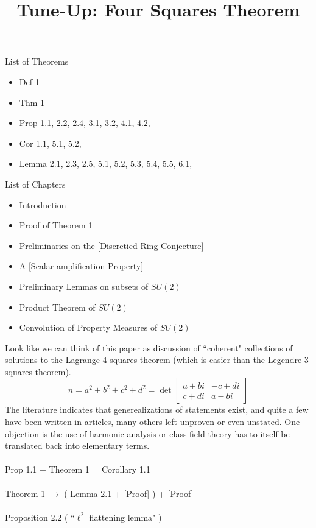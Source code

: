 \documentclass[12pt]{article}
\title{Tune-Up: Four Squares Theorem}
\date{}
\begin{document}
\sffamily

\maketitle

\noindent List of Theorems  

\begin{itemize}
\item Def 1
\item Thm 1
\item Prop 1.1, 2.2, 2.4, 3.1, 3.2, 4.1, 4.2, 
\item Cor 1.1, 5.1, 5.2, 
\item Lemma 2.1, 2.3, 2.5, 5.1, 5.2, 5.3, 5.4, 5.5, 6.1, 
\end{itemize}
List of Chapters 
\begin{itemize}
\item Introduction
\item Proof of Theorem 1
\item Preliminaries on the [Discretied Ring Conjecture]
\item A [Scalar amplification Property]
\item Preliminary Lemmas on subsets of $SU(2)$
\item Product Theorem of $SU(2)$
\item Convolution of Property Measures of $SU(2)$
\end{itemize}
Look like we can think of this paper as discussion of ``coherent" collections of solutions to the Lagrange 4-squares theorem (which is easier than the Legendre 3-squares theorem). 
$$ n = a^2 + b^2 + c^2 + d^2 = \det \left[\begin{array}{cr} a + bi & -c + di \\ c + di & a - bi\end{array} \right] $$
The literature indicates that generealizations of statements exist, and quite a few have been written in articles, many others left unproven or even unstated.  One objection is the use of harmonic analysis or class field theory has to itself be translated back into elementary terms. \\ \\
Prop 1.1 + Theorem 1 = Corollary 1.1 \\ \\
Theorem 1 $\to$ ( Lemma 2.1 + [Proof] ) +  [Proof] \\ \\
Proposition 2.2 ( ``$\ell^2$ flattening lemma" ) \\ \\
\end{document}
